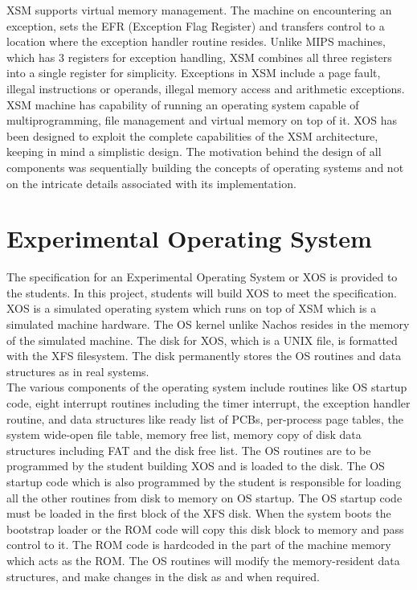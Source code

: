 \documentclass{sig-alternate}
\begin{document}
XSM supports virtual memory management. The machine on encountering an exception, sets the EFR (Exception Flag Register) and transfers control to a location where the exception handler routine resides. Unlike MIPS machines\cite{mips}, which has 3 registers for exception handling, XSM combines all three registers into a single register for simplicity. Exceptions in XSM include a page fault, illegal instructions or operands, illegal memory access and arithmetic exceptions. \\

XSM machine has capability of running an operating system capable of multiprogramming, file management and virtual memory on top of it. XOS has been designed to exploit the complete capabilities of the XSM architecture, keeping in mind a simplistic design. The motivation behind the design of all components was sequentially building the concepts of operating systems and not on the intricate details associated with its implementation.


\section{Experimental Operating System }

The specification for an Experimental Operating System or XOS is provided to the students. In this project, students will build XOS to meet the specification. XOS is a simulated operating system which runs on top of XSM which is a simulated machine hardware. The OS kernel unlike Nachos \cite{nachos} resides in the memory of the simulated machine. The disk for XOS, which is a UNIX file,  is formatted with the XFS filesystem. The disk permanently stores the OS routines and data structures as in real systems.  \\

The various components of the operating system include routines like OS startup code, eight interrupt routines including the timer interrupt, the exception handler routine, and data structures like ready list of PCBs, per-process page tables, the system wide-open file table, memory free list, memory copy of disk data structures including FAT and the disk free list. The OS routines are to be programmed by the student building XOS and is loaded to the disk. The OS startup code which is also programmed by the student is responsible for loading all the other routines from disk to memory on OS startup. The OS startup code must be loaded in the first block of the XFS disk. When the system boots the bootstrap loader or the ROM code will copy this disk block to memory and pass control to it. The ROM code is hardcoded in the part of the machine memory which acts as the ROM. The OS routines will modify the memory-resident data structures, and make changes in the disk as and when required. \\
\end{document}
